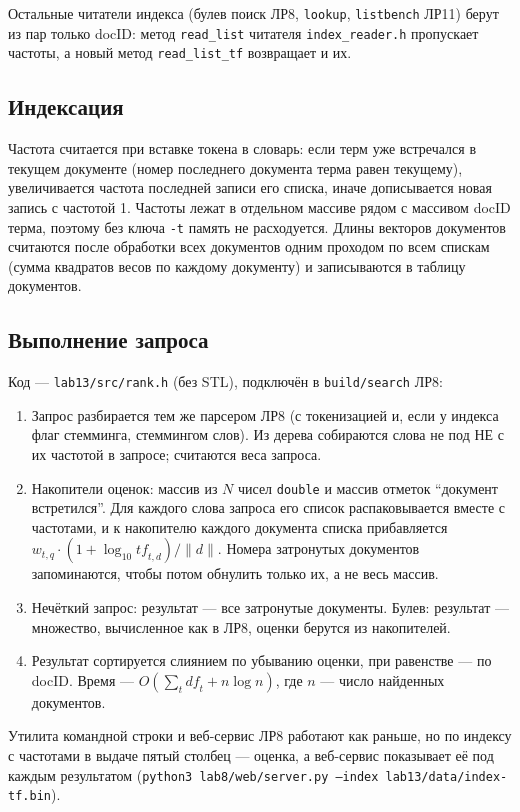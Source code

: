 Остальные читатели индекса (булев поиск ЛР8, \texttt{lookup}, \texttt{listbench} ЛР11) берут из пар только docID: метод \texttt{read\_list} читателя \texttt{index\_reader.h} пропускает частоты, а новый метод \texttt{read\_list\_tf} возвращает и их.

\subsection{Индексация}
Частота считается при вставке токена в словарь: если терм уже встречался в текущем документе (номер последнего документа терма равен текущему), увеличивается частота последней записи его списка, иначе дописывается новая запись с частотой 1. Частоты лежат в отдельном массиве рядом с массивом docID терма, поэтому без ключа \texttt{-t} память не расходуется. Длины векторов документов считаются после обработки всех документов одним проходом по всем спискам (сумма квадратов весов по каждому документу) и записываются в таблицу документов.

\subsection{Выполнение запроса}
Код --- \texttt{lab13/src/rank.h} (без STL), подключён в \texttt{build/search} ЛР8:
\begin{enumerate}
    \item Запрос разбирается тем же парсером ЛР8 (с токенизацией и, если у индекса флаг стемминга, стеммингом слов). Из дерева собираются слова не под НЕ с их частотой в запросе; считаются веса запроса.
    \item Накопители оценок: массив из $N$ чисел \texttt{double} и массив отметок \enquote{документ встретился}. Для каждого слова запроса его список распаковывается вместе с частотами, и к накопителю каждого документа списка прибавляется $w_{t,q} \cdot (1 + \log_{10} \mathit{tf}_{t,d}) / \|d\|$. Номера затронутых документов запоминаются, чтобы потом обнулить только их, а не весь массив.
    \item Нечёткий запрос: результат --- все затронутые документы. Булев: результат --- множество, вычисленное как в ЛР8, оценки берутся из накопителей.
    \item Результат сортируется слиянием по убыванию оценки, при равенстве --- по docID. Время --- $O(\sum_t \mathit{df}_t + n \log n)$, где $n$ --- число найденных документов.
\end{enumerate}
Утилита командной строки и веб-сервис ЛР8 работают как раньше, но по индексу с частотами в выдаче пятый столбец --- оценка, а веб-сервис показывает её под каждым результатом (\texttt{python3 lab8/web/server.py --index lab13/data/index-tf.bin}).

